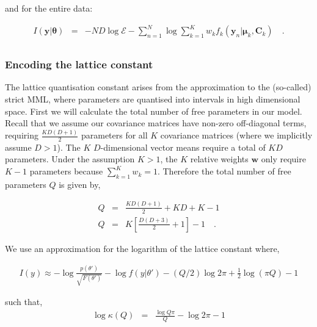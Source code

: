 \documentclass{aastex61}
\newcommand{\vect}[1]{\boldsymbol{\mathbf{#1}}}
\def\veccov{\vect{C}}
\def\vecmean{\vect{\mu}}
\def\vectheta{\vect{\theta}}
\def\weight{w}
\def\weights{\vect{\weight}}
\def\datum{y}
\def\data{\vect{\datum}}
\begin{document}
\noindent{}and for the entire data:

\begin{eqnarray}
  I(\data|\vectheta) &=& -ND\log\mathcal{E} - \sum_{n=1}^{N}\log\sum_{k=1}^{K}w_{k}f_k(\data_n|\vecmean_k,\veccov_k) \quad .\\
\end{eqnarray}


\subsubsection{Encoding the lattice constant}
\label{sec:encoding-lattice-constant}

The lattice quantisation constant arises from the approximation to the (so-called)
strict MML, where parameters are quantised into intervals in high dimensional
space.
First we will calculate the total number of free parameters in our model.
Recall that we assume our covariance matrices have non-zero off-diagonal terms,
requiring $\frac{KD(D+1)}{2}$ parameters for all $K$ covariance matrices
(where we implicitly assume $D > 1$).
The $K$ $D$-dimensional vector means require a total of $KD$ parameters.
Under the assumption $K > 1$, the $K$ relative weights $\weights$ only require
$K - 1$ parameters because $\sum_{k=1}^{K}\weight_k = 1$.
Therefore the total number of free parameters $Q$ is given by,

\begin{eqnarray}
  Q &=& \frac{KD(D+1)}{2} + KD + K - 1 \nonumber \\
  Q &=& K\left[\frac{D\left(D+3\right)}{2} + 1\right] - 1 \quad .
  \label{eq:q}
\end{eqnarray}

We use an approximation for the logarithm of the lattice constant
\citep[see Sections 5.2.12 and 3.3.4 of ][]{Wallace_2005} where,

\begin{eqnarray}
    I(y) \approx - \log\frac{p(\theta')}{\sqrt{F(\theta')}} 
                   - \log{f(y|\theta')}
                   - (Q/2)\log{2\pi}
                   + \frac{1}{2}\log{(\pi{}Q)}
                   - 1
\end{eqnarray}

\noindent{}such that,
\begin{eqnarray}
  \log\kappa(Q) &=& \frac{\log{Q\pi}}{Q} - \log{2\pi} - 1
\end{eqnarray}
\end{document}
